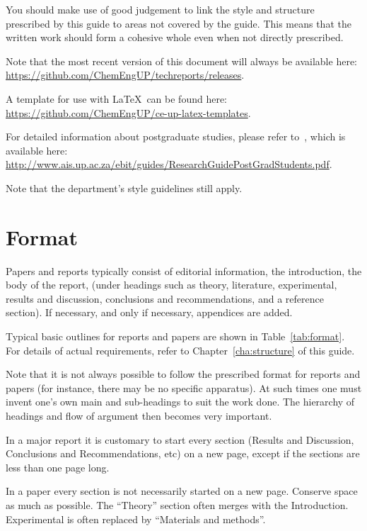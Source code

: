 \documentclass[a5paper, 10pt]{article}
\begin{document}
You should make use of good judgement to link the style and
structure prescribed by this guide to areas not covered by the guide.
This means that the written work should form a cohesive whole even
when not directly prescribed.

Note that the most recent version of this document will always be available
here:\\
\url{https://github.com/ChemEngUP/techreports/releases}.

A template for use with \LaTeX\ can be found here:\\
\url{https://github.com/ChemEngUP/ce-up-latex-templates}.

For detailed information about postgraduate studies,
please refer to~\citet{buys}, which is available here:\\
\url{http://www.ais.up.ac.za/ebit/guides/ResearchGuidePostGradStudents.pdf}.

Note that the department's style guidelines still apply.


\section{Format}
\label{cha:format}
Papers and reports typically consist of editorial information, the
introduction, the body of the report, (under headings such as theory,
literature, experimental, results and discussion, conclusions and recommendations, and a reference section).
If necessary, and only if necessary, appendices are added.

Typical basic outlines for reports and papers are shown in
Table~\ref{tab:format}.
For details of actual requirements, refer to
Chapter~\ref{cha:structure} of this guide.  

Note that it is not always possible to follow the prescribed format for reports and papers (for instance, there may be no specific apparatus).  
At such times one must invent one's own main and sub-headings to suit the work done.  
The hierarchy of headings and flow of argument then becomes very important.

In a major report it is customary to start every section (Results and Discussion,
Conclusions and Recommendations, etc) on a new page, except if the sections are less than one page long.

In a paper every section is not necessarily started on a new page.
Conserve space as much as possible. The ``Theory'' section often merges with the
Introduction. Experimental is often replaced by ``Materials and methods''.
\end{document}
